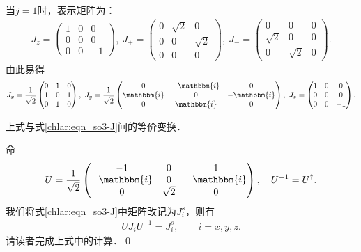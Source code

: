 \noindent  当$j=1$时，表示矩阵为：
\begin{align}
    J_z=\begin{pmatrix}
            1 & 0 & 0 \\   0 & 0 & 0 \\    0 & 0 & -1 
    \end{pmatrix},\
    J_{+}=\begin{pmatrix}
        0 & \sqrt{2} & 0 \\ 0 & 0 & \sqrt{2} \\ 0 & 0 & 0
    \end{pmatrix},\
    J_{-}=\begin{pmatrix}
        0 & 0 & 0\\ \sqrt{2} & 0 &0 \\ 0 & \sqrt{2} & 0
    \end{pmatrix}.
\end{align}
由此易得
\setlength{\mathindent}{0em}
\begin{align}
    J_{x}=\frac{1}{\sqrt{2}} \begin{pmatrix}
        0 & 1 & 0 \\ 1 & 0 & 1 \\ 0 & 1 & 0
    \end{pmatrix},\ 
    J_{y}=\frac{1}{\sqrt{2}}\begin{pmatrix}
        0 & -\mathbbm{i} & 0\\ \mathbbm{i} & 0 &-\mathbbm{i} \\ 0 & \mathbbm{i} & 0
    \end{pmatrix},\ 
    J_z=\begin{pmatrix}
        1 & 0 & 0 \\   0 & 0 & 0 \\    0 & 0 & -1 
    \end{pmatrix}.
\end{align}\setlength{\mathindent}{2em}

\begin{example}
	上式与式\eqref{chlar:eqn_so3-J}间的等价变换．
\end{example}
命
\begin{align}
U=\frac{1}{\sqrt{2}}
	\begin{pmatrix}
		-1 & 0 & 1 \\
		-\mathbbm{i} & 0 & -\mathbbm{i} \\
		0 & \sqrt{2} & 0 
	\end{pmatrix}, 
	\quad U^{-1} = U^\dagger.
\end{align}	
我们将式\eqref{chlar:eqn_so3-J}中矩阵改记为$J_i^s$，则有
\begin{align}
	U  J_i U^{-1} =  J_i^s ,\qquad i = x,y,z .
\end{align}
请读者完成上式中的计算．\qed

